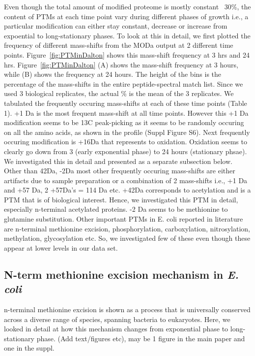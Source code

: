 \documentclass[12pt]{article}
\begin{document}
Even though the total amount of modified proteome is mostly constant ~30\%, the content of PTMs at each time point vary during different phases of growth i.e., a particular modification can either stay constant, decrease or increase from expoential to long-stationary phases. To look at this in detail, we first plotted the frequency of different mass-shifts from the MODa output at 2 different time points. Figure~\ref{fig:PTMinDalton} shows this mass-shift frequency at 3 hrs and 24 hrs. Figure~\ref{fig:PTMinDalton} (A) shows the mass-shift frequency at 3 hours, while (B) shows the frequency at 24 hours. The height of the bins is the percentage of the mass-shifts in the entire peptide-spectral match list. Since we used 3 biological replicates, the actual \% is the mean of the 3 replicates. We tabulated the frequently occuring mass-shifts at each of these time points (Table 1). +1 Da is the most frequent mass-shift at all time points. However this +1 Da modification seems to be 13C peak-picking as it seems to be randomly occuring on all the amino acids, as shown in the profile (Suppl Figure S6). Next frequently occuring modification is +16Da that represents to oxidation. Oxidation seems to clearly go down from 3 (early exponential phase) to 24 hours (stationary phsae). We investigated this in detail and presented as a separate subsection below. Other than 42Da, -2Da most other frequently occuring mass-shifts are either artifacts due to sample preparation or a combination of 2 mass-shifts i.e., +1 Da and +57 Da, 2 +57Da's = 114 Da etc. +42Da corresponds to acetylation and is a PTM that is of biological interest. Hence, we investigated this PTM in detail, especially n-terminal acetylated proteins. -2 Da seems to be methionine to glutamine substitution. Other important PTMs in E. coli reported in literature are n-terminal methionine excision, phosphorylation, carboxylation, nitrosylation, methylation, glycosylation etc. So, we investigated few of these even though these appear at lower levels in our data set.


\subsection{N-term methionine excision mechanism in \emph{E. coli}}
n-terminal methionine excision is shown as a process that is universally conserved across a diverse range of species, spanning bacteria to eukaryotes. Here, we looked in detail at how this mechanism changes from exponential phase to long-stationary phase. (Add text/figures etc), may be 1 figure in the main paper and one in the suppl.
\end{document}
